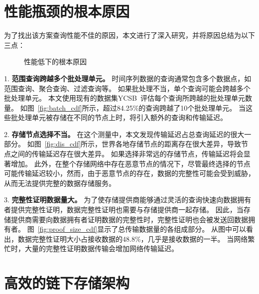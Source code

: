 \section{性能瓶颈的根本原因}
为了找出该方案查询性能不佳的原因，本文进行了深入研究，并将原因总结为以下三点：

\begin{figure*}[t]
    \centering
    \begin{minipage}{0.9\linewidth}
	    \centering
        \hfill
        \hfill
        \caption{性能低下的根本原因} 
    \end{minipage}
\end{figure*}

1. \textbf{范围查询跨越多个批处理单元。}
时间序列数据的查询通常包含多个数据点，如范围查询、聚合查询、过滤查询等。
如果批处理不当，单个查询可能会跨越多个批处理单元。
本文使用现有的数据集YCSB~\cite{barata2014ycsb}评估每个查询所跨越的批处理单元数量。
如图~\autoref{fig:batch_cdf}所示，超过84.25\%的查询跨越了10个批处理单元。
当这些批处理单元被存储在不同的节点上时，将引入额外的查询和传输延迟。

2. \textbf{存储节点选择不当。}
在这个测量中，本文发现传输延迟占总查询延迟的很大一部分。
如图~\autoref{fig:dis_cdf}所示，世界各地存储节点的距离存在很大差异，导致节点之间的传输延迟存在很大差异。
如果选择非常远的存储节点，传输延迟将会显著增加。
此外，在整个存储网络中存在恶意节点的情况下，尽管最终选择的节点可能传输延迟较小，然而，由于恶意节点的存在，数据的完整性可能会受到威胁，从而无法提供完整的数据存储服务。

3. \textbf{完整性证明数据量大。}
为了使存储提供商能够通过灵活的查询快速向数据拥有者提供完整性证明，数据完整性证明也需要与存储提供商一起存储。
因此，当存储提供商需要向数据拥有者证明数据的完整性时，完整性证明也会被发送回数据拥有者。
图~\autoref{fig:proof_size_cdf}显示了总传输数据量的各组成部分。
从图中可以看出，数据完整性证明大小占接收数据的48.8\%，几乎是接收数据的一半。
当网络繁忙时，大量的完整性证明数据传输会增加网络传输延迟。

\section{高效的链下存储架构}
\label{sec:design}

